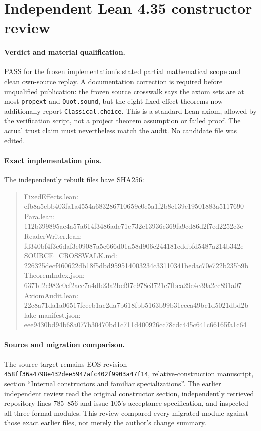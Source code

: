 \documentclass{article}
\begin{document}
\section*{Independent Lean 4.35 constructor review}
\paragraph{Verdict and material qualification.}
PASS for the frozen implementation's stated partial mathematical scope and clean own-source replay. A documentation correction is required before unqualified publication: the frozen source crosswalk says the axiom sets are at most \texttt{propext} and \texttt{Quot.sound}, but the eight fixed-effect theorems now additionally report \texttt{Classical.choice}. This is a standard Lean axiom, allowed by the verification script, not a project theorem assumption or failed proof. The actual trust claim must nevertheless match the audit. No candidate file was edited.

\paragraph{Exact implementation pins.}
The independently rebuilt files have SHA256:
\begin{quote}\ttfamily
FixedEffects.lean: efb8a5cbb403fa1a4554a683286710659c0e5a1f2b8c139c19501883a5117690\\
Para.lean: 112b399895ae4a57a614f3486ade71e732e13936c369fa9cd86d2f7ed2252c3c\\
ReaderWriter.lean: fd340bf4f3e6daf3e09087a5c666d01a58d906c244181cddbfd5487a214b342e\\
SOURCE\_CROSSWALK.md: 226325decf460622db18f5dbd959514003234c33110341bedac70e722b235b9b\\
TheoremIndex.json: 6371d2c982e0cf2aec7a4db23a2bef97e978e3721c7fbea29c4e39a2cc891a07\\
AxiomAudit.lean: 22c8a71da1a06517fceeb1ac2da7b618fbb5163b99b31ccca49bc1d5021dbd2b\\
lake-manifest.json: eee9430bd94b68a077b30470bd1c711d400926cc78cdc445c641c66165fa1c64
\end{quote}

\paragraph{Source and migration comparison.}
The source target remains EOS revision \texttt{458ff36a4798e432dee5947afc402f9903a47f14}, relative-construction manuscript, section ``Internal constructors and familiar specializations''. The earlier independent review read the original constructor section, independently retrieved repository lines 785--856 and issue 105's acceptance specification, and inspected all three formal modules. This review compared every migrated module against those exact earlier files, not merely the author's change summary.
\end{document}
